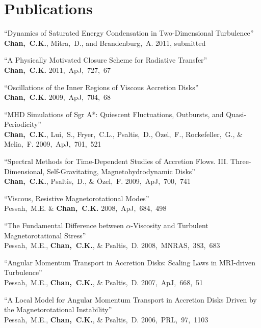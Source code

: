 \section*{Publications}

\begin{ilist}

\item ``Dynamics of Saturated Energy Condensation in Two-Dimensional Turbulence''\\
  \textbf{Chan,~C.K.}, Mitra,~D., and Brandenburg,~A. 2011, submitted

\item  ``A Physically Motivated Closure Scheme for Radiative Transfer''\\
  \textbf{Chan,~C.K.} 2011,~ApJ,~727,~67

\item ``Oscillations of the Inner Regions of Viscous Accretion Disks''\\
  \textbf{Chan,~C.K.} 2009,~ApJ,~704,~68

\item  ``MHD Simulations of Sgr A*: Quiescent Fluctuations, Outbursts, and Quasi-Periodicity''\\
  \textbf{Chan,~C.K.}, Lui,~S., Fryer,~C.L., Psaltis,~D., \"Ozel,~F., Rockefeller,~G., \& Melia,~F. 2009,~ApJ,~701,~521

\item  ``Spectral Methods for Time-Dependent Studies of Accretion Flows. III.
  Three-Dimensional, Self-Gravitating, Magnetohydrodynamic Disks''\\
  \textbf{Chan,~C.K.}, Psaltis,~D., \& \"Ozel,~F. 2009,~ApJ,~700,~741

\item ``Viscous, Resistive Magnetorotational Modes''\\
  Pessah,~M.E. \& \textbf{Chan,~C.K.} 2008,~ApJ,~684,~498

\item  ``The Fundamental Difference between $\alpha$-Viscosity and Turbulent Magnetorotational Stress''\\
  Pessah,~M.E., \textbf{Chan,~C.K.}, \& Psaltis,~D. 2008,~MNRAS,~383,~683

\item  ``Angular Momentum Transport in Accretion Disks: Scaling Laws in MRI-driven Turbulence''\\
  Pessah,~M.E., \textbf{Chan,~C.K.}, \& Psaltis,~D. 2007,~ApJ,~668,~51

\item  ``A Local Model for Angular Momentum Transport in Accretion Disks Driven by the Magnetorotational Instability''\\
  Pessah,~M.E., \textbf{Chan,~C.K.}, \& Psaltis,~D. 2006,~PRL,~97,~1103


\end{ilist}
